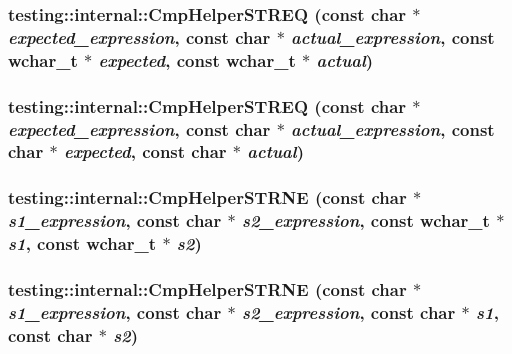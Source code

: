 \subsubsection{ testing::internal::CmpHelperSTREQ (const char $\ast$ {\em expected\_\-expression}, const char $\ast$ {\em actual\_\-expression}, const wchar\_\-t $\ast$ {\em expected}, const wchar\_\-t $\ast$ {\em actual})}\label{namespacetesting_1_1internal_e4281191b4e1e0277917e77eb3ba130e}


\subsubsection{ testing::internal::CmpHelperSTREQ (const char $\ast$ {\em expected\_\-expression}, const char $\ast$ {\em actual\_\-expression}, const char $\ast$ {\em expected}, const char $\ast$ {\em actual})}\label{namespacetesting_1_1internal_0fa5116298109df6acd3d919223e14db}


\subsubsection{ testing::internal::CmpHelperSTRNE (const char $\ast$ {\em s1\_\-expression}, const char $\ast$ {\em s2\_\-expression}, const wchar\_\-t $\ast$ {\em s1}, const wchar\_\-t $\ast$ {\em s2})}\label{namespacetesting_1_1internal_d32db74c173fd831050b6601d981965e}


\subsubsection{ testing::internal::CmpHelperSTRNE (const char $\ast$ {\em s1\_\-expression}, const char $\ast$ {\em s2\_\-expression}, const char $\ast$ {\em s1}, const char $\ast$ {\em s2})}\label{namespacetesting_1_1internal_51488673d7489dbbabf399905632070c}


